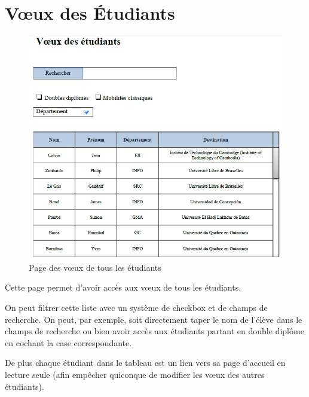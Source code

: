 \section{Vœux des Étudiants}
\label{sec::stud_wish}


\begin{figure}[H]
	\includegraphics[scale=0.8]{Etudiant/Voeux.PNG}
	\caption{Page des vœux de tous les étudiants}
\end{figure}


Cette page permet d'avoir accès aux vœux de tous les étudiants.

On peut filtrer cette liste avec un système de checkbox et de champs de recherche. On peut, par exemple, soit directement taper le nom de l'élève dans le champs de recherche ou bien avoir accès aux étudiants partant en double diplôme en cochant la case correspondante.

De plus chaque étudiant dans le tableau est un lien vers sa page d'accueil en lecture seule (afin empêcher quiconque de modifier les vœux des autres étudiants).

